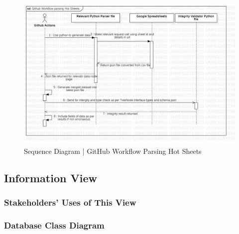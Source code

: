 \begin{figure}[H]
  \centering
  \includegraphics[width=\linewidth]{img/sequence-diagram-3.jpg}
  \caption{Sequence Diagram | GitHub Workflow Parsing Hot Sheets}
\end{figure}

\subsection{Information View}

\subsubsection{Stakeholders' Uses of This View}

\subsubsection{Database Class Diagram}

